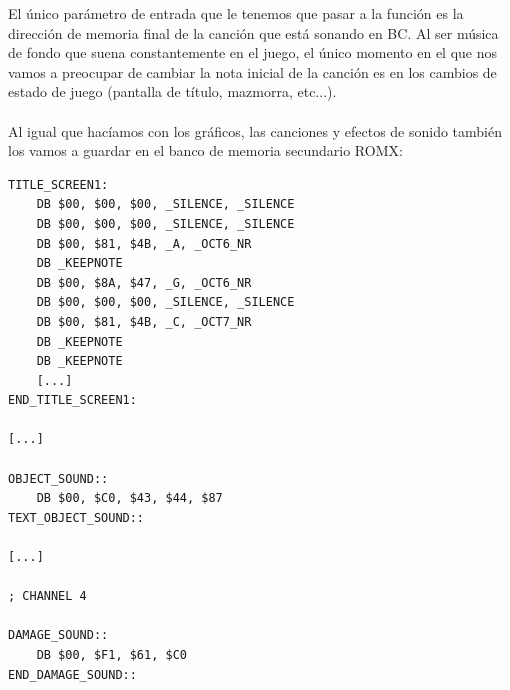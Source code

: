 El único parámetro de entrada que le tenemos que pasar a la función es la dirección de memoria final de la canción que está sonando en BC. Al ser música de fondo que suena constantemente en el juego, el único momento en el que nos vamos a preocupar de cambiar la nota inicial de la canción es en los cambios de estado de juego (pantalla de título, mazmorra, etc...).
\\ \\
Al igual que hacíamos con los gráficos, las canciones y efectos de sonido también los vamos a guardar en el banco de memoria secundario ROMX:

\begin{lstlisting}[caption={Música y SFX en ROMX}, label={code:musicromx}]
TITLE_SCREEN1:
    DB $00, $00, $00, _SILENCE, _SILENCE
    DB $00, $00, $00, _SILENCE, _SILENCE
    DB $00, $81, $4B, _A, _OCT6_NR
    DB _KEEPNOTE
    DB $00, $8A, $47, _G, _OCT6_NR
    DB $00, $00, $00, _SILENCE, _SILENCE
    DB $00, $81, $4B, _C, _OCT7_NR 
    DB _KEEPNOTE
    DB _KEEPNOTE
    [...]
END_TITLE_SCREEN1:

[...]

OBJECT_SOUND::
    DB $00, $C0, $43, $44, $87
TEXT_OBJECT_SOUND::

[...]

; CHANNEL 4

DAMAGE_SOUND::
    DB $00, $F1, $61, $C0
END_DAMAGE_SOUND::
\end{lstlisting}

